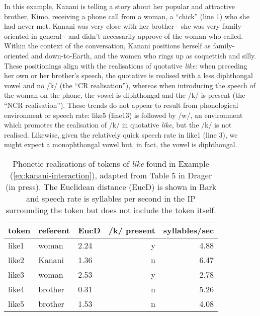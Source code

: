 \noindent In this example, Kanani is telling a story about her popular and attractive brother, Kimo, receiving a phone call from a woman, a ``chick'' (line 1) who she had never met.  Kanani was very close with her brother - she was very family-oriented in general - and didn't necessarily approve of the woman who called.  Within the context of the conversation, Kanani positions herself as family-oriented and down-to-Earth, and the women who rings up as coquettish and silly.  These positionings align with the realisations of quotative \textit{like}: when preceding her own or her brother's speech, the quotative is realised with a less diphthongal vowel and no /k/ (the ``CR realisation''), whereas when introducing the speech of the woman on the phone, the vowel is diphthongal and the /k/ is present (the ``NCR realisation''). These trends do not appear to result from phonological environment or speech rate: like5 (line13) is followed by /w/, an environment which promotes the realisation of /k/ in quotative \textit{like}, but the /k/ is not realised.  Likewise, given the relatively quick speech rate in like1 (line 3), we might expect a monophthongal vowel but, in fact, the vowel is diphthongal.

\begin{table}[htbp]
\caption{Phonetic realisations of tokens of \textit{like} found in Example (\ref{ex:kanani-interaction}), adapted from Table 5 in Drager (in press).  The Euclidean distance (EucD) is shown in Bark and speech rate is syllables per second in the IP surrounding the token but does not include the token itself.}	
	\label{tab:kanani-interaction}
	 \begin{center}
		\begin{tabular}{lllrr}\hline
	
   token & referent & EucD & /k/ present & syllables/sec\\
  \hline
like1 & woman & 2.24 & y & 4.88 \\
like2 & Kanani & 1.36 & n & 6.47 \\
like3 & woman & 2.53 & y & 2.78 \\
like4 & brother & 0.31 & n & 5.26 \\
like5 & brother & 1.53 & n & 4.08 \\

\hline
		\end{tabular}
	
	\end{center}
\end{table} 

